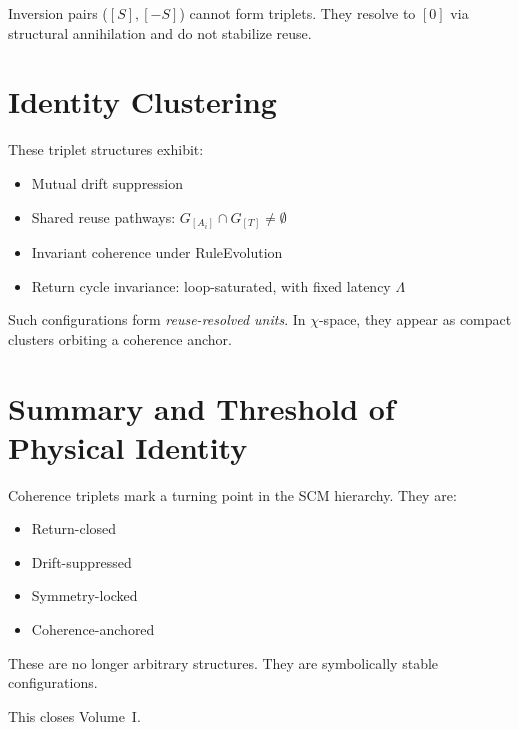\medskip

Inversion pairs ($[S], [-S]$) cannot form triplets.  
They resolve to $[0]$ via structural annihilation and do not stabilize reuse.

\section{Identity Clustering} \label{identity-clustering}

These triplet structures exhibit:
\begin{itemize}
  \item Mutual drift suppression
  \item Shared reuse pathways: $G_{[A_i]} \cap G_{[T]} \ne \emptyset$
  \item Invariant coherence under RuleEvolution
  \item Return cycle invariance: loop-saturated, with fixed latency $\Lambda$
\end{itemize}

Such configurations form \textit{reuse-resolved units}.  
In $\chi$-space, they appear as compact clusters orbiting a coherence anchor.

\section{Summary and Threshold of Physical Identity} \label{summary-and-threshold-of-physical-identity}

Coherence triplets mark a turning point in the SCM hierarchy.  
They are:

\begin{itemize}
  \item Return-closed
  \item Drift-suppressed
  \item Symmetry-locked
  \item Coherence-anchored
\end{itemize}

These are no longer arbitrary structures.  
They are symbolically stable configurations.

\medskip

This closes Volume~I.
